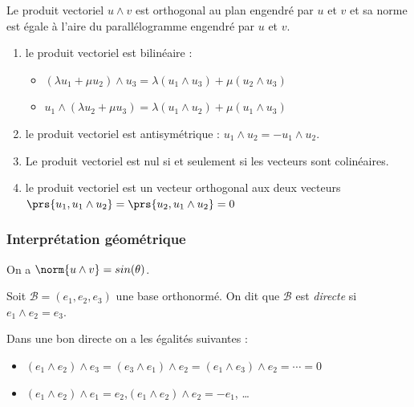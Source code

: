 Le produit vectoriel $u\wedge v$ est orthogonal au plan engendré par $u$ et $v$ et sa norme est égale à l'aire du parallélogramme engendré par $u$ et $v$.
\begin{proposition}
	\begin{enumerate}
		\item	le produit vectoriel est bilinéaire :
			\begin{itemize}
				\item  $(\lambda u_1 + \mu u_2)\wedge u_3 = \lambda (u_1\wedge u_3) + \mu (u_2\wedge u_3) $
				\item $ u_1\wedge (\lambda u_2 + \mu u_3) = \lambda (u_1\wedge u_2) + \mu (u_1 \wedge u_3) $ 
			\end{itemize}

		\item	le produit vectoriel est antisymétrique : $u_1 \wedge u_2 = -u_1\wedge u_2$.
		\item Le produit vectoriel est nul si et seulement si les vecteurs sont colinéaires.
		\item	le produit vectoriel est un vecteur orthogonal aux deux vecteurs
			 $\prs{u_1, u_1 \wedge u_2} = \prs{u_2, u_1\wedge u_2 } =0 $
	\end{enumerate}
\end{proposition}

\subsubsection{Interprétation géométrique}

On a $\norm{u\wedge v} = sin(\theta)$.

\begin{definition}
	Soit $\mathcal B = (e_1,e_2,e_3)$ une base orthonormé. On dit que $\mathcal B$ est \emph{directe} si  $e_1 \wedge e_2 = e_3$. 
\end{definition}

\begin{remark}
	Dans une bon directe on a les égalités suivantes :
	\begin{itemize}
		\item	$ (e_1 \wedge e_2) \wedge e_3 = (e_3 \wedge e_1) \wedge e_2  = (e_1 \wedge e_3) \wedge e_2 = \cdots = 0$
		\item	$(e_1 \wedge e_2) \wedge e_1 = e_2 $,$(e_1 \wedge e_2) \wedge e_2 = -e_1 $, \ldots
	\end{itemize}

\end{remark}


